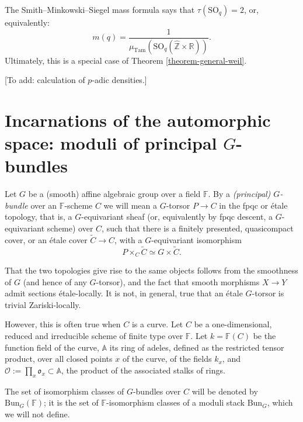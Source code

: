 \begin{remark}
\label{remark-SMS-formula}
The Smith--Minkowski--Siegel mass formula says that $\tau(\text{SO}_q)=2$, or, equivalently:
\begin{equation}
 \label{equation-SMSmassformula}
		m(q)=\frac{1}{\mu_{\text{Tam}}(\text{SO}_q(\hat{\mathbb{Z}}\times \mathbb{R}))}.
\end{equation}
Ultimately, this is a special case of Theorem \ref{theorem-general-weil}.
\end{remark}



[To add: calculation of $p$-adic densities.]




\section{Incarnations of the automorphic space: moduli of principal $G$-bundles}
\label{section-BunG}


Let $G$ be a (smooth) affine algebraic group over a field $\mathbb F$. 
By a \emph{(principal) $G$-bundle} over an $\mathbb F$-scheme $C$ we will mean a $G$-torsor $P\to C$ in the fpqc or \'etale topology, that is, a $G$-equivariant sheaf (or, equivalently by fpqc descent, a $G$-equivariant scheme) over $C$, such that there is a finitely presented, quasicompact cover, or an \'etale cover  $\tilde C\to C$, with a $G$-equivariant isomorphism
$$ P\times_C \tilde C \simeq G \times \tilde C.$$

That the two topologies give rise to the same objects follows from the smoothness of $G$ (and hence of any $G$-torsor), and the fact that smooth morphisms $X\to Y$ admit sections \'etale-locally. It is not, in general, true that an \'etale $G$-torsor is trivial Zariski-locally.



However, this is often true when $C$ is a curve. Let $C$ be a one-dimensional, reduced and irreducible scheme of finite type over $\mathbb F$. Let $k = \mathbb F(C)$ be the function field of the curve, $\mathbb A$ its ring of adeles, defined as the restricted tensor product, over all closed points $x$ of the curve, of the fields $k_x$, and $\mathcal O:= \prod_x \mathfrak o_x\subset \mathbb A$, the product of the associated stalks of rings. 





The set of isomorphism classes of $G$-bundles over $C$ will be denoted by $\text{Bun}_G(\mathbb F)$; it is the set of $\mathbb F$-isomorphism classes of a moduli stack $\text{Bun}_G$, which we will not define.


